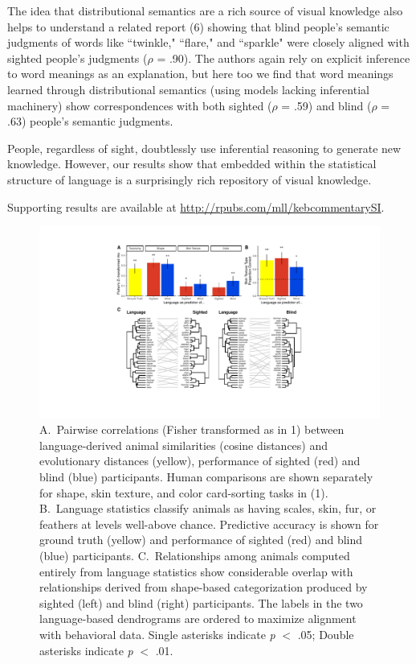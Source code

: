 \documentclass[12pt]{article}
\begin{document}
The idea that distributional semantics are a rich source of visual knowledge also helps to understand a related report (6) showing that blind people's semantic judgments of words like ``twinkle," ``flare," and ``sparkle" were closely aligned with sighted people's judgments ($\rho$ = .90). The authors again rely on explicit inference to word meanings as an explanation, but here too we find that word meanings learned through distributional semantics (using models lacking inferential machinery) show correspondences with both sighted ($\rho$ = .59) and blind ($\rho$ = .63) people's semantic judgments. 

People, regardless of sight, doubtlessly use inferential reasoning to generate new knowledge. However, our results show that embedded within the statistical structure of language is a surprisingly rich repository of visual knowledge.

Supporting results are available at \url{http://rpubs.com/mll/kebcommentarySI}.
\pagebreak

\begin{figure}[h!]
\centering
     \includegraphics[width=7in]{figureppt3.pdf}
      \caption{\footnotesize  A.\ Pairwise correlations (Fisher transformed as in 1) between language-derived animal similarities (cosine distances) and evolutionary distances (yellow), performance of sighted (red) and blind (blue) participants. Human comparisons are shown separately for shape, skin texture, and color card-sorting tasks in (1). B.\ Language statistics classify animals as having scales, skin, fur, or feathers at levels well-above chance. Predictive accuracy is shown for ground truth (yellow) and performance of sighted (red) and blind (blue) participants.  C.\ Relationships among animals computed entirely from language statistics show considerable overlap with relationships derived from shape-based categorization produced by sighted (left) and blind (right) participants. The labels in the two language-based dendrograms are ordered to maximize alignment with behavioral data. Single asterisks indicate \textit{p} $<$  .05; Double asterisks indicate \textit{p} $<$ .01. }
\end{figure}
\end{document}
